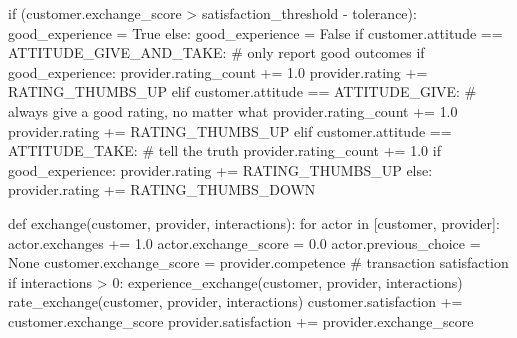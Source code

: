 \documentclass[
  letterpaper,
  DIV=11,
  numbers=noendperiod]{scrartcl}
\newenvironment{Shaded}{\begin{snugshade}}{\end{snugshade}}
\newcommand{\CommentTok}[1]{\textcolor[rgb]{0.37,0.37,0.37}{#1}}
\newcommand{\ControlFlowTok}[1]{\textcolor[rgb]{0.00,0.23,0.31}{#1}}
\newcommand{\DecValTok}[1]{\textcolor[rgb]{0.68,0.00,0.00}{#1}}
\newcommand{\FloatTok}[1]{\textcolor[rgb]{0.68,0.00,0.00}{#1}}
\newcommand{\KeywordTok}[1]{\textcolor[rgb]{0.00,0.23,0.31}{#1}}
\newcommand{\NormalTok}[1]{\textcolor[rgb]{0.00,0.23,0.31}{#1}}
\newcommand{\OperatorTok}[1]{\textcolor[rgb]{0.37,0.37,0.37}{#1}}
\newcommand{\VariableTok}[1]{\textcolor[rgb]{0.07,0.07,0.07}{#1}}
\begin{document}
\begin{Shaded}
\begin{Highlighting}[]
    \ControlFlowTok{if}\NormalTok{ (customer.exchange\_score  }\OperatorTok{\textgreater{}}\NormalTok{ satisfaction\_threshold }\OperatorTok{{-}}\NormalTok{ tolerance):}
\NormalTok{        good\_experience }\OperatorTok{=} \VariableTok{True}
    \ControlFlowTok{else}\NormalTok{:}
\NormalTok{        good\_experience }\OperatorTok{=} \VariableTok{False}
    \ControlFlowTok{if}\NormalTok{ customer.attitude }\OperatorTok{==}\NormalTok{ ATTITUDE\_GIVE\_AND\_TAKE:}
        \CommentTok{\# only report good outcomes}
        \ControlFlowTok{if}\NormalTok{ good\_experience:}
\NormalTok{            provider.rating\_count }\OperatorTok{+=} \FloatTok{1.0}
\NormalTok{            provider.rating }\OperatorTok{+=}\NormalTok{ RATING\_THUMBS\_UP}
    \ControlFlowTok{elif}\NormalTok{ customer.attitude }\OperatorTok{==}\NormalTok{ ATTITUDE\_GIVE:}
        \CommentTok{\# always give a good rating, no matter what}
\NormalTok{        provider.rating\_count }\OperatorTok{+=} \FloatTok{1.0}
\NormalTok{        provider.rating }\OperatorTok{+=}\NormalTok{ RATING\_THUMBS\_UP}
    \ControlFlowTok{elif}\NormalTok{ customer.attitude }\OperatorTok{==}\NormalTok{ ATTITUDE\_TAKE:}
        \CommentTok{\# tell the truth}
\NormalTok{        provider.rating\_count }\OperatorTok{+=} \FloatTok{1.0}
        \ControlFlowTok{if}\NormalTok{ good\_experience:}
\NormalTok{            provider.rating }\OperatorTok{+=}\NormalTok{ RATING\_THUMBS\_UP}
        \ControlFlowTok{else}\NormalTok{:}
\NormalTok{            provider.rating }\OperatorTok{+=}\NormalTok{ RATING\_THUMBS\_DOWN}
            
\KeywordTok{def}\NormalTok{ exchange(customer, provider, interactions):}
    \ControlFlowTok{for}\NormalTok{ actor }\KeywordTok{in}\NormalTok{ [customer, provider]:}
\NormalTok{        actor.exchanges }\OperatorTok{+=} \FloatTok{1.0}
\NormalTok{        actor.exchange\_score }\OperatorTok{=} \FloatTok{0.0}
\NormalTok{        actor.previous\_choice }\OperatorTok{=} \VariableTok{None}
\NormalTok{    customer.exchange\_score }\OperatorTok{=}\NormalTok{ provider.competence }\CommentTok{\# transaction satisfaction}
    \ControlFlowTok{if}\NormalTok{ interactions }\OperatorTok{\textgreater{}} \DecValTok{0}\NormalTok{:}
\NormalTok{        experience\_exchange(customer, provider, interactions)}
\NormalTok{    rate\_exchange(customer, provider, interactions)}
\NormalTok{    customer.satisfaction }\OperatorTok{+=}\NormalTok{ customer.exchange\_score}
\NormalTok{    provider.satisfaction }\OperatorTok{+=}\NormalTok{ provider.exchange\_score}
\end{Highlighting}
\end{Shaded}
\end{document}
